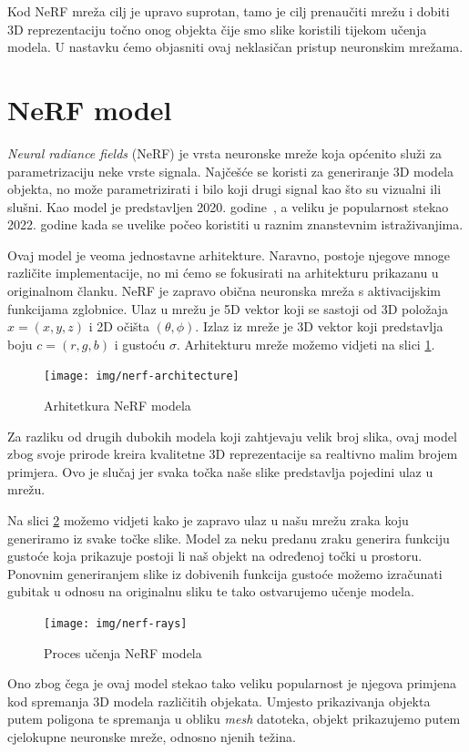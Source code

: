 \documentclass[times, utf8, diplomskirad]{fer}
\begin{document}
Kod NeRF mreža cilj je upravo suprotan, tamo je cilj prenaučiti mrežu i dobiti 3D reprezentaciju točno onog objekta čije smo slike koristili tijekom učenja modela.
U nastavku ćemo objasniti ovaj neklasičan pristup neuronskim mrežama.
\section{NeRF model}
\textit{Neural radiance fields} (NeRF) je vrsta neuronske mreže koja općenito služi za parametrizaciju neke vrste signala.
Najčešće se koristi za generiranje 3D modela objekta, no može parametrizirati i bilo koji drugi signal kao što su vizualni ili slušni.
Kao model je predstavljen 2020. godine~\cite{mildenhall2020nerf}, a veliku je popularnost stekao 2022. godine kada se uvelike počeo koristiti u raznim znanstevnim istraživanjima.

Ovaj model je veoma jednostavne arhitekture.
Naravno, postoje njegove mnoge različite implementacije, no mi ćemo se fokusirati na arhitekturu prikazanu u originalnom članku\cite{mildenhall2020nerf}.
NeRF je zapravo obična neuronska mreža s aktivacijskim funkcijama zglobnice.
Ulaz u mrežu je 5D vektor koji se sastoji od 3D položaja $x = (x,y,z)$ i 2D očišta $(\theta, \phi)$.
Izlaz iz mreže je 3D vektor koji predstavlja boju $c = (r,g,b)$ i gustoću $\sigma$.
Arhitekturu mreže možemo vidjeti na slici \ref{fig:nerf-architecture}.
\begin{figure}[H]
    \centering
    \texttt{[image: img/nerf-architecture]}
    \caption{Arhitetkura NeRF modela}
    \label{fig:nerf-architecture}
\end{figure}

Za razliku od drugih dubokih modela koji zahtjevaju velik broj slika, ovaj model zbog svoje prirode kreira kvalitetne 3D reprezentacije sa realtivno malim brojem primjera.
Ovo je slučaj jer svaka točka naše slike predstavlja pojedini ulaz u mrežu.

Na slici \ref{fig:nerf-rays} možemo vidjeti kako je zapravo ulaz u našu mrežu zraka koju generiramo iz svake točke slike.
Model za neku predanu zraku generira funkciju gustoće koja prikazuje postoji li naš objekt na određenoj točki u prostoru.
Ponovnim generiranjem slike iz dobivenih funkcija gustoće možemo izračunati gubitak u odnosu na originalnu sliku te tako ostvarujemo učenje modela.

\begin{figure}[H]
    \centering
    \texttt{[image: img/nerf-rays]}
    \caption{Proces učenja NeRF modela}
    \label{fig:nerf-rays}
\end{figure}
\newpage
Ono zbog čega je ovaj model stekao tako veliku popularnost je njegova primjena kod spremanja 3D modela različitih objekata.
Umjesto prikazivanja objekta putem poligona te spremanja u obliku \textit{mesh} datoteka, objekt prikazujemo putem cjelokupne neuronske mreže, odnosno njenih težina.
\end{document}
